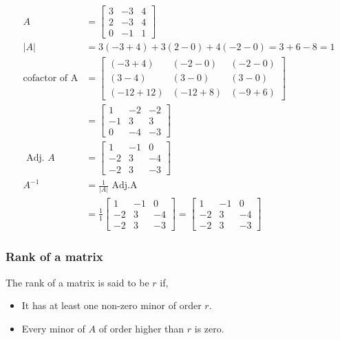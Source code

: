 \begin{answer}
$$
\begin{aligned}
	A&=\left[\begin{array}{rrr}3 & -3 & 4 \\ 2 & -3 & 4 \\ 0 & -1 & 1\end{array}\right]\\
	|A|&=3(-3+4)+3(2-0)+4(-2-0)=3+6-8=1\\
	\text{cofactor of A}&=\left[\begin{array}{lll}
		(-3+4) & (-2-0) & (-2-0) \\
		(3-4) & (3-0) & (3-0) \\
		(-12+12) & (-12+8) & (-9+6)
	\end{array}\right]\\&= \left[\begin{array}{rrr}1 & -2 & -2 \\ -1 & 3 & 3 \\ 0 & -4 & -3\end{array}\right]\\\text { Adj. } A&=\left[\begin{array}{rrr}1 & -1 & 0 \\ -2 & 3 & -4 \\ -2 & 3 & -3\end{array}\right]\\ A^{-1}&=\frac{1}{|A|} \text { Adj.A }\\ &=\frac{1}{1}\left[\begin{array}{rrr}1 & -1 & 0 \\ -2 & 3 & -4 \\ -2 & 3 & -3\end{array}\right]=\left[\begin{array}{rrr}1 & -1 & 0 \\ -2 & 3 & -4 \\ -2 & 3 & -3\end{array}\right]
\end{aligned}$$
\end{answer}
	

\subsubsection{Rank of a matrix}

The rank of a matrix is said to be $r$ if,
\begin{itemize}
	\item It has at least one non-zero minor of order $r$.
	\item Every minor of $A$ of order higher than $r$ is zero. 
\end{itemize}
 
